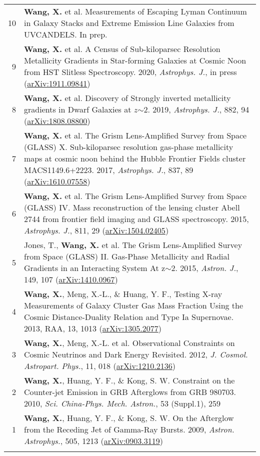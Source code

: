 \documentclass[letterpaper,10pt]{article}
\begin{document}
\begin{longtable}{rp{6.3in}}
10 &  \textbf{Wang, X.} et al. Measurements of Escaping Lyman Continuum in Galaxy Stacks and Extreme Emission Line Galaxies from UVCANDELS. In prep. \\
9 &  \textbf{Wang, X.} et al. A Census of Sub-kiloparsec Resolution Metallicity Gradients in Star-forming Galaxies at Cosmic Noon from HST Slitless Spectroscopy. 2020, \textit{Astrophys. J.}, in press (\href{https://arxiv.org/abs/1911.09841}{arXiv:1911.09841}) \\
8 &  \textbf{Wang, X.} et al. Discovery of Strongly inverted metallicity gradients in Dwarf Galaxies at $z$$\sim$2. 2019, \textit{Astrophys. J.}, 882, 94 (\href{https://arxiv.org/abs/1808.08800}{arXiv:1808.08800})  \\
7 &  \textbf{Wang, X.} et al. The Grism Lens-Amplified Survey from Space (GLASS) X. Sub-kiloparsec resolution gas-phase metallicity maps at cosmic noon behind the Hubble Frontier Fields cluster MACS1149.6+2223. 2017, \textit{Astrophys. J.}, 837, 89 (\href{http://arxiv.org/abs/1610.07558}{arXiv:1610.07558})     \\
6 &  \textbf{Wang, X.} et al. The Grism Lens-Amplified Survey from Space (GLASS) IV. Mass reconstruction of the lensing cluster Abell 2744 from frontier field imaging and GLASS spectroscopy. 2015, \textit{Astrophys. J.}, 811, 29 (\href{http://arxiv.org/abs/1504.02405}{arXiv:1504.02405})  \\
5 &  Jones, T., \textbf{Wang, X.} et al. The Grism Lens-Amplified Survey from Space (GLASS) II. Gas-Phase Metallicity and Radial Gradients in an Interacting System At z$\sim$2. 2015, \textit{Astron. J.}, 149, 107 (\href{http://arxiv.org/abs/1410.0967}{arXiv:1410.0967})    \\
4 &  \textbf{Wang, X.}, Meng, X.-L., \& Huang, Y. F., Testing X-ray Measurements of Galaxy Cluster Gas Mass Fraction Using the Cosmic Distance-Duality Relation and Type Ia Supernovae. 2013, RAA, 13, 1013 (\href{http://arxiv.org/abs/1305.2077}{arXiv:1305.2077})  \\
3 &  \textbf{Wang, X.}, Meng, X.-L. et al. Observational Constraints on Cosmic Neutrinos and Dark Energy Revisited. 2012, \textit{J. Cosmol. Astropart. Phys.}, 11, 018 (\href{http://arxiv.org/abs/1210.2136}{arXiv:1210.2136})  \\
2 &  \textbf{Wang, X.}, Huang, Y. F., \& Kong, S. W. Constraint on the Counter-jet Emission in GRB Afterglows from GRB 980703. 2010, \textit{Sci. China-Phys. Mech. Astron.}, 53 (Suppl.1), 259     \\
1 &  \textbf{Wang, X.}, Huang, Y. F., \& Kong, S. W. On the Afterglow from the Receding Jet of Gamma-Ray Bursts. 2009, \textit{Astron. Astrophys.}, 505, 1213 (\href{http://arxiv.org/abs/0903.3119}{arXiv:0903.3119})    \\
$$
\end{longtable}
\end{document}

